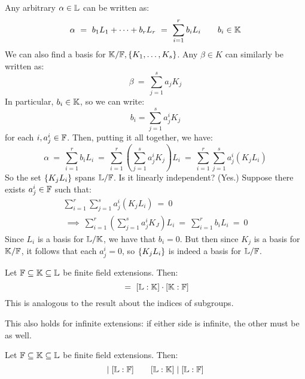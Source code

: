Any arbitrary $ \alpha \in \mathbb{L} $ can be written as:
\begin{equation*}
    \alpha \ = \ b_{1}L_{1} + \dots + b_{r}L_{r} \ = \
    \sum_{i=1}^{r}b_{i}L_{i} \qquad b_{i} \in \mathbb{K}
\end{equation*}
We can also find a basis for $ \mathbb{K}/\mathbb{F}, \left\{{K_{1}, \dots, K_{s}}\right\} $.
Any $ \beta \in K $ can similarly be written as:
\begin{equation*}
    \beta \ = \ \sum_{j=1}^{s}a_{j}K_{j}
\end{equation*}
In particular, $ b_{i} \in \mathbb{K} $, so we can write:
\begin{equation*}
    b_{i} = \sum_{j=1}^{s}a_{j}^{i}K_{j}
\end{equation*}
for each $ i, a_{j}^{i} \in \mathbb{F} $. Then, putting it all together, we have:
\begin{equation*}
    \alpha \ = \ \sum_{i=1}^{r}b_{i}L_{i} \ = \ \sum_{i=1}^{r}\left(
    \sum_{j=1}^{s}a_{j}^{i}K_{j} \right)L_{i} \ = \
    \sum_{i=1}^{r}\sum_{j=1}^{s}a_{j}^{i}(K_{j}L_{i})
\end{equation*}
So the set $ \left\{{K_{j}L_{i}}\right\} $ spans $ \mathbb{L}/\mathbb{F} $. Is it linearly
independent? (Yes.)
Suppose there exists $ a_{j}^{i} \in \mathbb{F} $ such that:
\begin{gather*}
    \sum_{i=1}^{r}\sum_{j=1}^{s}a_{j}^{i}(K_{j}L_{i}) \ = \ 0 \\
    \ \implies \ \sum_{i=1}^{r}\left( \sum_{j=1}^{s}a_{j}^{i}K_{J} \right)L_{i}
    \ = \ \sum_{i=1}^{r}b_{i}L_{i} \ = \ 0
\end{gather*}
Since $ L_{i} $ is a basis for $ \mathbb{L}/\mathbb{K} $, we have that $ b_{i} = 0 $.
But then since $ K_{j} $ is a basis for $ \mathbb{K}/\mathbb{F} $, it follows that each
$ a_{j}^{i} = 0 $, so $ \left\{{K_{j}L_{i}}\right\} $ is indeed a basis for
$ \mathbb{L}/\mathbb{F} $.

\begin{thm}
    Let $ \mathbb{F} \subseteq \mathbb{K} \subseteq \mathbb{L} $ be finite field extensions.
    Then:
    \begin{equation*}
        [\bb{L}:\bb{F}] \ = \ [\bb{L}:\bb{K}] \cdot [\bb{K}:\bb{F}]
    \end{equation*}
    This is analogous to the result about the indices of subgroups.
\end{thm}
This also holds for infinite extensions: if either side is infinite, the other
must be as well.
\begin{crll}[type=Corollary]
    Let $ \mathbb{F} \subseteq \mathbb{K} \subseteq \mathbb{L} $ be finite field extensions.
    Then:
    \begin{equation*}
        [\bb{K}:\bb{F}] \mid [\bb{L}:\bb{F}] \qquad
        [\bb{L}:\bb{K}] \mid [\bb{L}:\bb{F}]
    \end{equation*}
\end{crll}

